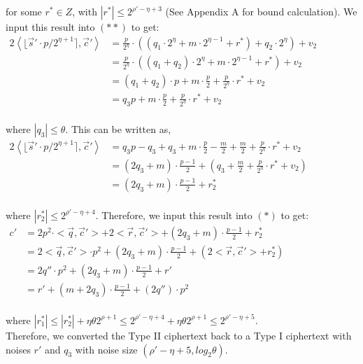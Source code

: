 \documentclass[../../main.tex]{subfiles}
\begin{document}
\noindent for some $r^* \in Z$, with $|r^*| \leq 2^{\rho'-\eta+3}$ (See Appendix A for bound calculation). We input this result into $(**)$ to get:
\begin{equation*}
    \begin{split}
        2\left<\lfloor \vec s' \cdot p/2^{\eta+1}\rceil, \vec c' \right> &= \frac{p}{2^\eta} \cdot ((q_1 \cdot 2^\eta + m \cdot 2^{\eta -1} + r^*) + q_2 \cdot 2^\eta) + v_2 \qquad \qquad \qquad \\
        &= \frac{p}{2^\eta} \cdot ((q_1 + q_2) \cdot 2^\eta + m \cdot 2^{\eta-1} + r^*) + v_2 \\
        &= (q_1 + q_2) \cdot p + m \cdot \frac{p}{2} + \frac{p}{2^\eta} \cdot r^* + v_2 \\
        &= q_3p + m \cdot \frac{p}{2} + \frac{p}{2^\eta} \cdot r^* + v_2 \\
    \end{split}
\end{equation*}

\noindent where $|q_3| \leq \theta$. This can be written as,
\begin{equation*}
    \begin{split}
        2\left<\lfloor \vec s' \cdot p/2^{\eta +1} \rceil, \vec c'\right> &= q_3p - q_3 + q_3 + m \cdot \frac{p}{2} - \frac{m}{2} + \frac{m}{2} + \frac{p}{2^\eta} \cdot r^* + v_2 \qquad \qquad \qquad \\
        &= (2q_3 + m) \cdot \frac{p-1}{2} + \left(q_3 + \frac{m}{2} + \frac{p}{2^\eta} \cdot r^* + v_2 \right) \\
        &= (2q_3 + m) \cdot \frac{p-1}{2} + r^*_2 \\
    \end{split}
\end{equation*}

\noindent where $|r^*_2| \leq 2^{\rho' - \eta + 4}$. Therefore, we input this result into $(*)$ to get:
\begin{equation*}
    \begin{split}
        c' &= 2p^2 \cdot <\vec q, \vec c'> + 2<\vec r, \vec c'> + (2q_3 + m) \cdot \frac{p-1}{2} + r^*_2 \qquad \qquad \qquad \qquad \qquad \qquad\\
           &= 2<\vec q, \vec c'> \cdot p^2 + (2q_3+m) \cdot \frac{p-1}{2} + (2<\vec r, \vec c'> + r^*_2) \\
           &= 2q'' \cdot p^2 + (2q_3+m) \cdot \frac{p-1}{2} + r'\\
           &= r' + (m + 2q_3) \cdot \frac{p-1}{2} + (2q'') \cdot p^2 \\
    \end{split}
\end{equation*}

\noindent where $|r^*_1| \leq |r^*_2| + \eta \theta 2^{\rho + 1} \leq 2^{\rho' - \eta + 4} + \eta \theta 2^{\rho + 1} \leq 2^{\rho' - \eta + 5}$.\\

\noindent Therefore, we converted the Type II ciphertext back to a Type I ciphertext with noises $r'$ and $q_3$ with noise size $(\rho' - \eta + 5, log_2\theta)$.
\end{document}
